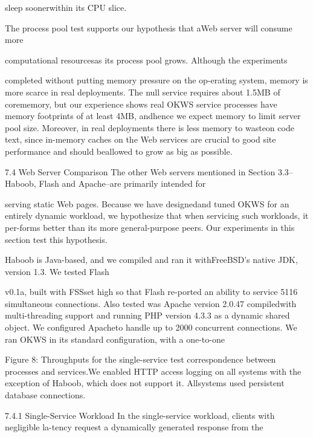 sleep soonerwithin its CPU slice.

The process pool test supports our hypothesis that aWeb server will consume more

computational resourcesas its process pool grows. Although the experiments

completed without putting memory pressure on the op-erating system, memory is more scarce in real deployments. The null service requires about 1.5MB of corememory, but our experience shows real OKWS service
processes have memory footprints of at least 4MB, andhence we expect memory to limit server pool size. Moreover, in real deployments there is less memory to wasteon code text, since in-memory caches on the Web services are crucial to good site performance and should beallowed to grow as big as possible.

7.4 Web Server Comparison
The other Web servers mentioned in Section 3.3--Haboob, Flash and Apache--are primarily intended for

serving static Web pages. Because we have designedand tuned OKWS for an entirely dynamic workload, we
hypothesize that when servicing such workloads, it per-forms better than its more general-purpose peers. Our
experiments in this section test this hypothesis.

Haboob is Java-based, and we compiled and ran it withFreeBSD's native JDK, version 1.3. We tested Flash

v0.1a, built with F\Gamma  S\Delta \Theta S\Lambda \Xi \Delta  set high so that Flash re-ported an ability to service 5116 simultaneous connections. Also tested was Apache version 2.0.47 compiledwith multi-threading support and running PHP version
4.3.3 as a dynamic shared object. We configured Apacheto handle up to 2000 concurrent connections. We ran
OKWS in its standard configuration, with a one-to-one

Figure 8: Throughputs for the single-service test
correspondence between processes and services.We enabled HTTP access logging on all systems with
the exception of Haboob, which does not support it. Allsystems used persistent database connections.

7.4.1 Single-Service Workload
In the single-service workload, clients with negligible la-tency request a dynamically generated response from the


